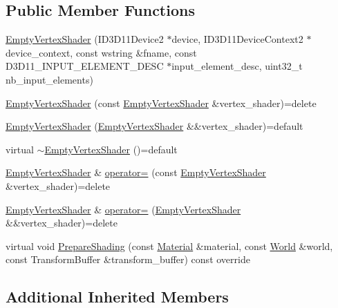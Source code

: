 \subsection*{Public Member Functions}
\begin{DoxyCompactItemize}
\item 
\hyperlink{classmage_1_1_empty_vertex_shader_a28fae401cf46242513144278dcd7f051}{Empty\+Vertex\+Shader} (I\+D3\+D11\+Device2 $\ast$device, I\+D3\+D11\+Device\+Context2 $\ast$device\+\_\+context, const wstring \&fname, const D3\+D11\+\_\+\+I\+N\+P\+U\+T\+\_\+\+E\+L\+E\+M\+E\+N\+T\+\_\+\+D\+E\+SC $\ast$input\+\_\+element\+\_\+desc, uint32\+\_\+t nb\+\_\+input\+\_\+elements)
\item 
\hyperlink{classmage_1_1_empty_vertex_shader_a6ab1b22d108fde8f8876e6a2e4c0decb}{Empty\+Vertex\+Shader} (const \hyperlink{classmage_1_1_empty_vertex_shader}{Empty\+Vertex\+Shader} \&vertex\+\_\+shader)=delete
\item 
\hyperlink{classmage_1_1_empty_vertex_shader_a04d905fda6f77338521746fee50e6bf7}{Empty\+Vertex\+Shader} (\hyperlink{classmage_1_1_empty_vertex_shader}{Empty\+Vertex\+Shader} \&\&vertex\+\_\+shader)=default
\item 
virtual \hyperlink{classmage_1_1_empty_vertex_shader_a321ef00a2087030b81713e989ab02306}{$\sim$\+Empty\+Vertex\+Shader} ()=default
\item 
\hyperlink{classmage_1_1_empty_vertex_shader}{Empty\+Vertex\+Shader} \& \hyperlink{classmage_1_1_empty_vertex_shader_a2683d29127405d51737008637ebde098}{operator=} (const \hyperlink{classmage_1_1_empty_vertex_shader}{Empty\+Vertex\+Shader} \&vertex\+\_\+shader)=delete
\item 
\hyperlink{classmage_1_1_empty_vertex_shader}{Empty\+Vertex\+Shader} \& \hyperlink{classmage_1_1_empty_vertex_shader_a449401b726fc5cd30012a3d8df2e0832}{operator=} (\hyperlink{classmage_1_1_empty_vertex_shader}{Empty\+Vertex\+Shader} \&\&vertex\+\_\+shader)=delete
\item 
virtual void \hyperlink{classmage_1_1_empty_vertex_shader_a93db8bae83473934fb202aa499af586b}{Prepare\+Shading} (const \hyperlink{structmage_1_1_material}{Material} \&material, const \hyperlink{classmage_1_1_world}{World} \&world, const Transform\+Buffer \&transform\+\_\+buffer) const override
\end{DoxyCompactItemize}
\subsection*{Additional Inherited Members}


